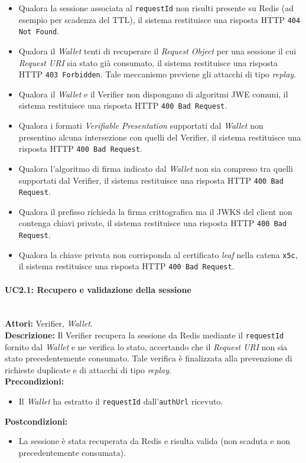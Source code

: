 \begin{itemize}
    \item Qualora la sessione associata al \texttt{requestId} non risulti presente su Redis (ad esempio per scadenza del TTL), il sistema restituisce una risposta HTTP \texttt{404 Not Found}.
    \item Qualora il \textit{Wallet} tenti di recuperare il \textit{Request Object} per una sessione il cui \textit{Request URI} sia stato già consumato, il sistema restituisce una risposta HTTP \texttt{403 Forbidden}. Tale meccanismo previene gli attacchi di tipo \textit{replay}.
    \item Qualora il \textit{Wallet} e il Verifier non dispongano di algoritmi JWE comuni, il sistema restituisce una risposta HTTP \texttt{400 Bad Request}.
    \item Qualora i formati \textit{Verifiable Presentation} supportati dal \textit{Wallet} non presentino alcuna intersezione con quelli del Verifier, il sistema restituisce una risposta HTTP \texttt{400 Bad Request}.
    \item Qualora l'algoritmo di firma indicato dal \textit{Wallet} non sia compreso tra quelli supportati dal Verifier, il sistema restituisce una risposta HTTP \texttt{400 Bad Request}.
    \item Qualora il prefisso richieda la firma crittografica ma il JWKS del client non contenga chiavi private, il sistema restituisce una risposta HTTP \texttt{400 Bad Request}.
    \item Qualora la chiave privata non corrisponda al certificato \textit{leaf} nella catena \texttt{x5c}, il sistema restituisce una risposta HTTP \texttt{400 Bad Request}.
\end{itemize}

\paragraph{\large\bfseries UC2.1: Recupero e validazione della sessione}
\label{uc:verifier:uc2.1}
\mbox{}\\
\noindent\textbf{Attori:} Verifier, \textit{Wallet}.
\\
\noindent\textbf{Descrizione:} Il Verifier recupera la sessione da Redis mediante il \texttt{requestId} fornito dal \textit{Wallet} e ne verifica lo stato, accertando che il \textit{Request URI} non sia stato precedentemente consumato. Tale verifica è finalizzata alla prevenzione di richieste duplicate e di attacchi di tipo \textit{replay}.
\\
\noindent\textbf{Precondizioni:}
\begin{itemize}
    \item Il \textit{Wallet} ha estratto il \texttt{requestId} dall'\texttt{authUrl} ricevuto.
\end{itemize}
\noindent\textbf{Postcondizioni:}
\begin{itemize}
    \item La sessione è stata recuperata da Redis e risulta valida (non scaduta e non precedentemente consumata).
\end{itemize}

